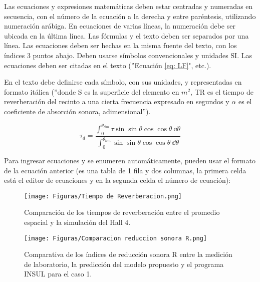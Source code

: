 Las ecuaciones y expresiones matemáticas deben estar centradas y numeradas en secuencia, con el número de la ecuación a la derecha y entre paréntesis, utilizando numeración arábiga. En ecuaciones de varias líneas, la numeración debe ser ubicada en la última línea. Las fórmulas y el texto deben ser separados por una línea. Las ecuaciones deben ser hechas en la misma fuente del texto, con los índices 3 puntos abajo. Deben usarse símbolos convencionales y unidades SI. Las ecuaciones deben ser citadas en el texto (''Ecuación \eqref{eq: LF}", etc.).

En el texto debe definirse cada símbolo, con sus unidades, y representadas en formato itálica (''donde S es la superficie del elemento en $m^2$, TR es el tiempo de reverberación del recinto a una cierta frecuencia expresado en segundos y $\alpha$ es el coeficiente de absorción sonora, adimensional”).

\begin{equation}
    \label{eq: LF}
    \tau_{d} = \frac{\int_{0}^{\theta_{lim}} \tau \sin \sin \theta \cos \cos \theta \ \dd \theta}{\int_{0}^{\theta_{lim}} \sin \sin \theta \cos \cos \theta \ \dd \theta}
\end{equation}

Para ingresar ecuaciones y se enumeren automáticamente, pueden usar el formato de la ecuación anterior (es una tabla de 1 fila y dos columnas, la primera celda está el editor de ecuaciones y en la segunda celda el número de ecuación): 


    \begin{figure}[h]
        \centering
        \texttt{[image: Figuras/Tiempo de Reverberacion.png]}
        \caption{Comparación de los tiempos de reverberación entre el promedio espacial y la simulación del Hall 4.}
        \label{fig:Tiempo de reverberacion}
    \end{figure}

    \begin{figure}[h]
        \centering
        \texttt{[image: Figuras/Comparacion reduccion sonora R.png]}
        \caption{Comparativa de los índices de reducción sonora R entre la medición de laboratorio, la predicción del modelo propuesto y el programa INSUL para el caso 1.}
        \label{fig:Comparativa R}
    \end{figure}



